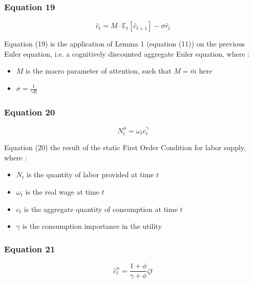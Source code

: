 \documentclass{article}
\begin{document}
\subsubsection*{Equation 19}
\begin{equation}\tag{19}
    \hat{c}_{t}=M\cdot\mathbb{E}_{t}\left[\hat{c}_{t+1}\right]-\sigma\hat{r}_{t}
\end{equation}

Equation (19) is the application of Lemma 1 (equation (11)) on the previous Euler equation, i.e. a cognitively discounted aggregate Euler equation, where : 
\begin{itemize}
    \item $M$ is the macro parameter of attention, such that $M=\bar{m}$ here
    \item $\sigma=\frac{1}{\gamma R}$
\end{itemize}

\subsubsection*{Equation 20}
\begin{equation}\tag{20}
    N^{\phi}_{t}=\omega_{t}c_{t}^{\gamma}
\end{equation}

Equation (20) the result of the static First Order Condition for labor supply, where : 
\begin{itemize}
    \item $N_{t}$ is the quantity of labor provided at time $t$
    \item $\omega_{t}$ is the real wage at time $t$
    \item $c_{t}$ is the aggregate quantity of consumption at time $t$
    \item $\gamma$ is the consumption importance in the utility
\end{itemize}

\subsubsection*{Equation 21}
\begin{equation}\tag{21}
    \hat{c}_{t}^{n}=\frac{1+\phi}{\gamma+\phi}\zeta{t}
\end{equation}
\end{document}
